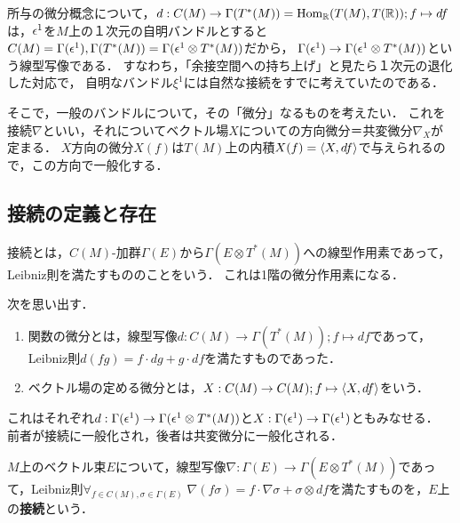 \documentclass[uplatex,dvipdfmx]{jsreport}
\begin{document}
\begin{tcolorbox}[colframe=ForestGreen, colback=ForestGreen!10!white,breakable,colbacktitle=ForestGreen!40!white,coltitle=black,fonttitle=\bfseries\sffamily,
title=接続とそれが定める共変微分]
    所与の微分概念について，$d:C(M)\to\Gamma(T^*(M))=\mathrm{Hom}_{\mathbb{R}}(T(M),T(\mathbb{R}));f\mapsto df$は，$\epsilon^1$を$M$上の１次元の自明バンドルとすると$C(M)=\Gamma(\epsilon^1),\Gamma(T^*(M))=\Gamma(\epsilon^1\otimes T^*(M))$だから，
    $\Gamma(\epsilon^1)\to\Gamma(\epsilon^1\otimes T^*(M))$という線型写像である．
    すなわち，「余接空間への持ち上げ」と見たら１次元の退化した対応で，
    自明なバンドル$\xi^1$には自然な接続をすでに考えていたのである．

    そこで，一般のバンドルについて，その「微分」なるものを考えたい．
    これを接続$\nabla$といい，それについてベクトル場$X$についての方向微分＝共変微分$\nabla_X$が定まる．
    $X$方向の微分$X(f)$は$T(M)$上の内積$X(f)=\langle X,df\rangle$で与えられるので，この方向で一般化する．
\end{tcolorbox}

\subsection{接続の定義と存在}

\begin{tcolorbox}[colframe=ForestGreen, colback=ForestGreen!10!white,breakable,colbacktitle=ForestGreen!40!white,coltitle=black,fonttitle=\bfseries\sffamily,
title=]
    接続とは，$C(M)$-加群$\Gamma(E)$から$\Gamma(E\otimes T^*(M))$への線型作用素であって，Leibniz則を満たすもののことをいう．
    これは1階の微分作用素になる．
\end{tcolorbox}

\begin{discussion}
    次を思い出す．
    \begin{enumerate}
        \item 関数の微分とは，線型写像$d:C(M)\to\Gamma(T^*(M));f\mapsto df$であって，Leibniz則$d(fg)=f\cdot dg+g\cdot df$を満たすものであった．
        \item ベクトル場の定める微分とは，$X:C(M)\to C(M);f\mapsto\langle X,df\rangle$をいう．
    \end{enumerate}
    これはそれぞれ$d:\Gamma(\epsilon^1)\to\Gamma(\epsilon^1\otimes T^*(M))$と$X:\Gamma(\epsilon^1)\to\Gamma(\epsilon^1)$ともみなせる．
    前者が接続に一般化され，後者は共変微分に一般化される．
\end{discussion}

\begin{definition}[connection]
    $M$上のベクトル束$E$について，線型写像$\nabla:\Gamma(E)\to\Gamma(E\otimes T^*(M))$であって，Leibniz則$\forall_{f\in C(M),\sigma\in\Gamma(E)}\;\nabla(f\sigma)=f\cdot\nabla\sigma+\sigma\otimes df$を満たすものを，$E$上の\textbf{接続}という．
\end{definition}
\end{document}
